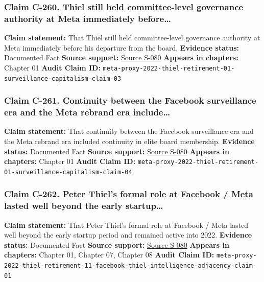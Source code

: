 \documentclass[
  american,
  11pt,
  letterpaper,
]{article}
\begin{document}
\subsubsection{Claim C-260. Thiel still held committee-level governance
authority at Meta immediately
before\ldots{}}\label{claim-c-260-thiel-still-held-committee-level-governance-authority-at-meta-immediately-before}

\textbf{Claim statement:} That Thiel still held committee-level
governance authority at Meta immediately before his departure from the
board. \textbf{Evidence status:} Documented Fact \textbf{Source
support:}
\hyperref[source-s-080-meta-platforms-inc-2022-definitive-proxy-statement]{Source
S-080} \textbf{Appears in chapters:} Chapter 01 \textbf{Audit Claim ID:}
\texttt{meta-proxy-2022-thiel-retirement-01-surveillance-capitalism-claim-03}

\subsubsection{Claim C-261. Continuity between the Facebook surveillance
era and the Meta rebrand era
include\ldots{}}\label{claim-c-261-continuity-between-the-facebook-surveillance-era-and-the-meta-rebrand-era-include}

\textbf{Claim statement:} That continuity between the Facebook
surveillance era and the Meta rebrand era included continuity in elite
board membership. \textbf{Evidence status:} Documented Fact
\textbf{Source support:}
\hyperref[source-s-080-meta-platforms-inc-2022-definitive-proxy-statement]{Source
S-080} \textbf{Appears in chapters:} Chapter 01 \textbf{Audit Claim ID:}
\texttt{meta-proxy-2022-thiel-retirement-01-surveillance-capitalism-claim-04}

\subsubsection{Claim C-262. Peter Thiel's formal role at Facebook / Meta
lasted well beyond the early
startup\ldots{}}\label{claim-c-262-peter-thiel-s-formal-role-at-facebook-meta-lasted-well-beyond-the-early-startup}

\textbf{Claim statement:} That Peter Thiel's formal role at Facebook /
Meta lasted well beyond the early startup period and remained active
into 2022. \textbf{Evidence status:} Documented Fact \textbf{Source
support:}
\hyperref[source-s-080-meta-platforms-inc-2022-definitive-proxy-statement]{Source
S-080} \textbf{Appears in chapters:} Chapter 01, Chapter 07, Chapter 08
\textbf{Audit Claim ID:}
\texttt{meta-proxy-2022-thiel-retirement-11-facebook-thiel-intelligence-adjacency-claim-01}
\end{document}
